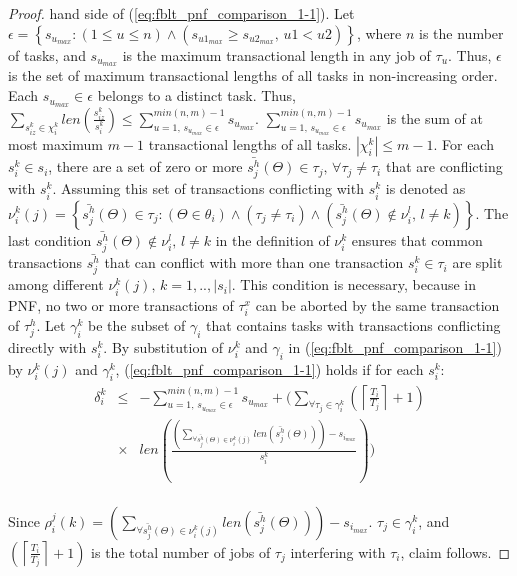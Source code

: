 \documentclass[conference]{IEEEtran}
\begin{document}
\begin{proof}
hand side of (\ref{eq:fblt_pnf_comparison_1-1}). Let $\epsilon=\left\{ s_{u_{max}}:(1\le u\le n)\wedge\left(s_{u1_{max}}\ge s_{u2_{max}},\, u1<u2\right)\right\} $,
where $n$ is the number of tasks, and $s_{u_{max}}$ is the maximum transactional
length in any job of $\tau_{u}$. Thus, $\epsilon$ is the set of
maximum transactional lengths of all tasks in non-increasing order.
Each $s_{u_{max}}\in\epsilon$ belongs to a distinct task. Thus, $\sum_{s_{iz}^{k}\in\chi_{i}^{k}}len\left(\frac{s_{iz}^{k}}{s_{i}^{k}}\right)\le\sum_{u=1,\, s_{u_{max}}\in\epsilon}^{min(n,m)-1}s_{u_{max}}$.
$\sum_{u=1,\, s_{u_{max}}\in\epsilon}^{min(n,m)-1}s_{u_{max}}$ is
the sum of at most maximum $m-1$ transactional lengths of all tasks.
$|\chi_{i}^{k}|\le m-1$. 
For each $s_{i}^{k}\in s_{i}$, there are a set of zero or more $\bar{s_{j}^{h}}(\Theta)\in\tau_{j},\,\forall\tau_{j}\ne\tau_{i}$
that are conflicting with $s_{i}^{k}$. Assuming this set of 
transactions conflicting with $s_{i}^{k}$ is denoted as $\nu_{i}^{k}(j)=\left\{ \bar{s_{j}^{h}}(\Theta)\in\tau_{j}:\left(\Theta\in\theta_{i}\right)\wedge\left(\tau_{j}\ne\tau_{i}\right)\wedge\left(\bar{s_{j}^{h}}(\Theta)\not\in\nu_{i}^{l},\, l\ne k\right)\right\} $.
The last condition $\bar{s_{j}^{h}}(\Theta)\not\in\nu_{i}^{l},\, l\ne k$
in the definition of $\nu_{i}^{k}$ ensures that common transactions
$\bar{s_{j}^{h}}$ that can conflict with more than one transaction
$s_{i}^{k}\in\tau_{i}$ are split among different $\nu_{i}^{k}(j),\, k=1,..,|s_{i}|$.
This condition is necessary, because in PNF, no two or more transactions of $\tau_{i}^{x}$ can be aborted by the same transaction of $\tau_{j}^{h}$. 
%
Let $\gamma_{i}^{k}$ be the subset of $\gamma_{i}$ that contains tasks with transactions conflicting directly with $s_{i}^{k}$. By substitution of $\nu_i^k$ and $\gamma_i$ in (\ref{eq:fblt_pnf_comparison_1-1}) by $\nu_{i}^{k}(j)$ and $\gamma_{i}^{k}$,
(\ref{eq:fblt_pnf_comparison_1-1}) holds if for each $s_{i}^{k}$:
%
\begin{eqnarray*}
\delta_{i}^{k} & \le & -\sum_{u=1,\, s_{u_{max}}\in\epsilon}^{min(n,m)-1}s_{u_{max}}+ \Bigg(\sum_{\forall\tau_{j}\in\gamma_{i}^{k}}\left(\left\lceil \frac{T_{i}}{T_{j}}\right\rceil +1\right)\label{eq:fblt_pnf_comparison_1-1-1-1}\\
& \times & len\left(\frac{\left(\sum_{\forall\bar{s_{j}^{h}}(\Theta)\in\nu_{i}^{k}(j)}len\left(\bar{s_{j}^{h}}(\Theta)\right)\right)-s_{i_{max}}}{s_{i}^{k}}\right)\Bigg)\nonumber\\ 
\end{eqnarray*}

Since $\rho_{i}^{j}(k)=\left(\sum_{\forall\bar{s_{j}^{h}}(\Theta)\in\nu_{i}^{k}(j)}len\left(\bar{s_{j}^{h}}(\Theta)\right)\right)-s_{i_{max}}$. $\tau_{j}\in\gamma_{i}^{k}$,
and $\left(\left\lceil \frac{T_{i}}{T_{j}}\right\rceil +1\right)$
is the total number of jobs of $\tau_{j}$ interfering with $\tau_{i}$, claim follows.
\end{proof}
\end{document}
